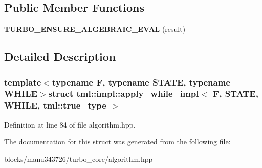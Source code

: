 \subsection*{Public Member Functions}
\begin{DoxyCompactItemize}
\item 
\hypertarget{structtml_1_1impl_1_1apply__while__impl_3_01_f_00_01_s_t_a_t_e_00_01_w_h_i_l_e_00_01tml_1_1true__type_01_4_a424e1f99f13393f85ff374226dc7ef89}{{\bfseries T\+U\+R\+B\+O\+\_\+\+E\+N\+S\+U\+R\+E\+\_\+\+A\+L\+G\+E\+B\+R\+A\+I\+C\+\_\+\+E\+V\+A\+L} (result)}\label{structtml_1_1impl_1_1apply__while__impl_3_01_f_00_01_s_t_a_t_e_00_01_w_h_i_l_e_00_01tml_1_1true__type_01_4_a424e1f99f13393f85ff374226dc7ef89}

\end{DoxyCompactItemize}


\subsection{Detailed Description}
\subsubsection*{template$<$typename F, typename S\+T\+A\+T\+E, typename W\+H\+I\+L\+E$>$struct tml\+::impl\+::apply\+\_\+while\+\_\+impl$<$ F, S\+T\+A\+T\+E, W\+H\+I\+L\+E, tml\+::true\+\_\+type $>$}



Definition at line 84 of file algorithm.\+hpp.



The documentation for this struct was generated from the following file\+:\begin{DoxyCompactItemize}
\item 
blocks/manu343726/turbo\+\_\+core/algorithm.\+hpp\end{DoxyCompactItemize}
